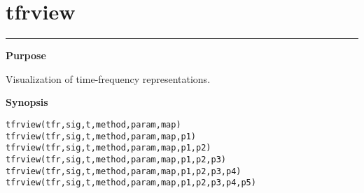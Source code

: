 

\section*{\hspace*{-1.6cm} tfrview}

\vspace*{-.4cm}
\hspace*{-1.6cm}\rule[0in]{16.5cm}{.02cm}
\vspace*{.2cm}

{\bf \large \sf Purpose}\\
\hspace*{1.5cm}
\begin{minipage}[t]{13.5cm}
Visualization of time-frequency representations.
\end{minipage}
\vspace*{.5cm}

{\bf \large \sf Synopsis}\\
\hspace*{1.5cm}
\begin{minipage}[t]{13.5cm}
\begin{verbatim}
tfrview(tfr,sig,t,method,param,map) 
tfrview(tfr,sig,t,method,param,map,p1) 
tfrview(tfr,sig,t,method,param,map,p1,p2) 
tfrview(tfr,sig,t,method,param,map,p1,p2,p3) 
tfrview(tfr,sig,t,method,param,map,p1,p2,p3,p4) 
tfrview(tfr,sig,t,method,param,map,p1,p2,p3,p4,p5) 
\end{verbatim}
\end{minipage}
\vspace*{.5cm}

